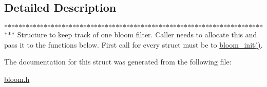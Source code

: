 \subsection{\-Detailed \-Description}
$\ast$$\ast$$\ast$$\ast$$\ast$$\ast$$\ast$$\ast$$\ast$$\ast$$\ast$$\ast$$\ast$$\ast$$\ast$$\ast$$\ast$$\ast$$\ast$$\ast$$\ast$$\ast$$\ast$$\ast$$\ast$$\ast$$\ast$$\ast$$\ast$$\ast$$\ast$$\ast$$\ast$$\ast$$\ast$$\ast$$\ast$$\ast$$\ast$$\ast$$\ast$$\ast$$\ast$$\ast$$\ast$$\ast$$\ast$$\ast$$\ast$$\ast$$\ast$$\ast$$\ast$$\ast$$\ast$$\ast$$\ast$$\ast$$\ast$$\ast$$\ast$$\ast$$\ast$$\ast$$\ast$$\ast$$\ast$$\ast$$\ast$$\ast$$\ast$$\ast$$\ast$$\ast$$\ast$ \-Structure to keep track of one bloom filter. \-Caller needs to allocate this and pass it to the functions below. \-First call for every struct must be to \hyperlink{bloom_8h_a4200639cd22be5866672454c059efaae}{bloom\-\_\-init()}. 

\-The documentation for this struct was generated from the following file\-:\begin{DoxyCompactItemize}
\item 
\hyperlink{bloom_8h}{bloom.\-h}\end{DoxyCompactItemize}
